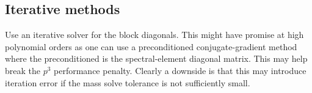 \documentclass[11pt]{amsart}
\begin{document}
\subsection{Iterative methods} 
Use an iterative solver for the block diagonals.  This might have promise at high polynomial orders as one can use a preconditioned conjugate-gradient method where the preconditioned is the spectral-element diagonal matrix.  This may help break the $p^3$ performance penalty.  Clearly a downside is that this may introduce iteration error if the mass solve tolerance is not sufficiently small.
\end{document}
